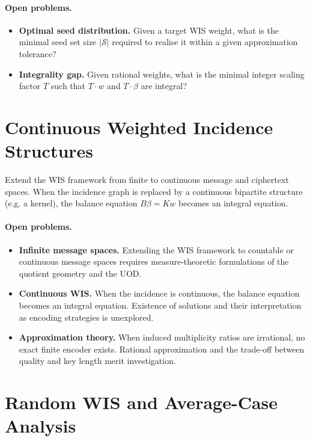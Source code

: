 \paragraph{Open problems.}
\begin{itemize}
\item \textbf{Optimal seed distribution.}  Given a target WIS
weight, what is the minimal seed set size $|\mathcal S|$
required to realise it within a given approximation tolerance?
\item \textbf{Integrality gap.}  Given rational weights, what is
the minimal integer scaling factor $T$ such that $T\cdot w$ and
$T\cdot\beta$ are integral?
\end{itemize}

\section{Continuous Weighted Incidence Structures}\label{ch:sec:open-continuous-wis}

Extend the WIS framework from finite to continuous message and
ciphertext spaces.  When the incidence graph is replaced by a
continuous bipartite structure (e.g. a kernel), the balance equation
$B\beta = Kw$ becomes an integral equation.

\paragraph{Open problems.}
\begin{itemize}
\item \textbf{Infinite message spaces.}  Extending the WIS framework to
countable or continuous message spaces requires measure-theoretic
formulations of the quotient geometry and the UOD.
\item \textbf{Continuous WIS.}  When the incidence is continuous, the
balance equation becomes an integral equation.  Existence of solutions
and their interpretation as encoding strategies is unexplored.
\item \textbf{Approximation theory.}  When induced multiplicity ratios
are irrational, no exact finite encoder exists.  Rational approximation
and the trade-off between quality and key length merit investigation.
\end{itemize}

\section{Random WIS and Average-Case Analysis}\label{ch:sec:open-random-wis}

